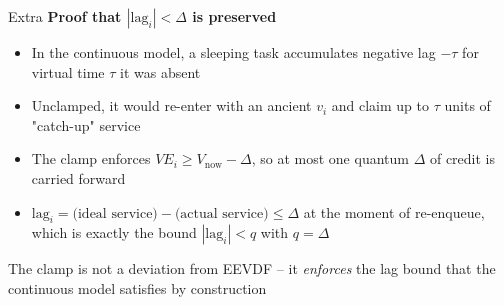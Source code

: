 \documentclass[aspectratio=169]{beamer}
\begin{document}
\begin{frame}{Extra}
        \textbf{Proof that $|\mathrm{lag}_i| < \Delta$ is preserved}

        \vspace{0.15cm}
        \begin{itemize}
                \item In the continuous model, a sleeping task accumulates
                        negative lag $-\tau$ for virtual time $\tau$ it was absent
                \item Unclamped, it would re-enter with an ancient $v_i$
                        and claim up to $\tau$ units of "catch-up" service
                \item The clamp enforces $VE_i \ge V_{\mathrm{now}} - \Delta$,
                        so at most one quantum $\Delta$ of credit is carried forward
                \item $\mathrm{lag}_i = \text{(ideal service)} -
                        \text{(actual service)} \le \Delta$ at the moment of
                        re-enqueue, which is exactly the bound $|\mathrm{lag}_i| < q$
                        with $q = \Delta$
        \end{itemize}

        \vspace{0.1cm}
        \begin{shadowbox}
                \footnotesize{The clamp is not a deviation from EEVDF --
                it \emph{enforces} the lag bound that
                the continuous model satisfies by construction}
        \end{shadowbox}
\end{frame}
\addtocounter{framenumber}{-1}
\end{document}
